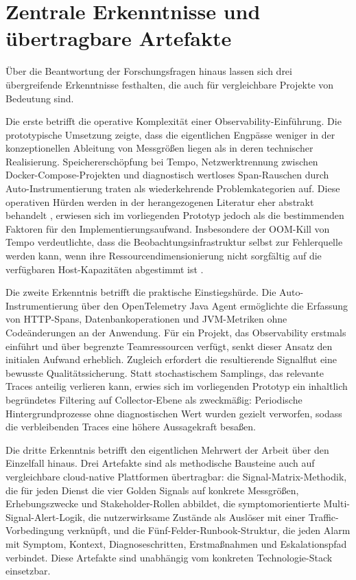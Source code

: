  
\section{Zentrale Erkenntnisse und übertragbare Artefakte}
 
Über die Beantwortung der Forschungsfragen hinaus lassen sich drei übergreifende Erkenntnisse festhalten, die auch für vergleichbare Projekte von Bedeutung sind.
 
Die erste betrifft die operative Komplexität einer Observability-Einführung. Die prototypische Umsetzung zeigte, dass die eigentlichen Engpässe weniger in der konzeptionellen Ableitung von Messgrößen liegen als in deren technischer Realisierung. Speichererschöpfung bei Tempo, Netzwerktrennung zwischen Docker-Compose-Projekten und diagnostisch wertloses Span-Rauschen durch Auto-Instrumentierung traten als wiederkehrende Problemkategorien auf. Diese operativen Hürden werden in der herangezogenen Literatur eher abstrakt behandelt \parencite[S.~7--9]{Niedermaier2019onObservability}, erwiesen sich im vorliegenden Prototyp jedoch als die bestimmenden Faktoren für den Implementierungsaufwand. Insbesondere der OOM-Kill von Tempo verdeutlichte, dass die Beobachtungsinfrastruktur selbst zur Fehlerquelle werden kann, wenn ihre Ressourcendimensionierung nicht sorgfältig auf die verfügbaren Host-Kapazitäten abgestimmt ist \parencite[S.~52]{bissig2024unified}.
 
Die zweite Erkenntnis betrifft die praktische Einstiegshürde. Die Auto-Instrumentierung über den OpenTelemetry Java Agent ermöglichte die Erfassung von HTTP-Spans, Datenbankoperationen und JVM-Metriken ohne Codeänderungen an der Anwendung. Für ein Projekt, das Observability erstmals einführt und über begrenzte Teamressourcen verfügt, senkt dieser Ansatz den initialen Aufwand erheblich. Zugleich erfordert die resultierende Signalflut eine bewusste Qualitätssicherung. Statt stochastischem Samplings, das relevante Traces anteilig verlieren kann, erwies sich im vorliegenden Prototyp ein inhaltlich begründetes Filtering auf Collector-Ebene als zweckmäßig: Periodische Hintergrundprozesse ohne diagnostischen Wert wurden gezielt verworfen, sodass die verbleibenden Traces eine höhere Aussagekraft besaßen.
 
Die dritte Erkenntnis betrifft den eigentlichen Mehrwert der Arbeit über den Einzelfall hinaus. Drei Artefakte sind als methodische Bausteine auch auf vergleichbare cloud-native Plattformen übertragbar: die Signal-Matrix-Methodik, die für jeden Dienst die vier Golden Signals auf konkrete Messgrößen, Erhebungszwecke und Stakeholder-Rollen abbildet, die symptomorientierte Multi-Signal-Alert-Logik, die nutzerwirksame Zustände als Auslöser mit einer Traffic-Vorbedingung verknüpft, und die Fünf-Felder-Runbook-Struktur, die jeden Alarm mit Symptom, Kontext, Diagnoseschritten, Erstmaßnahmen und Eskalationspfad verbindet. Diese Artefakte sind unabhängig vom konkreten Technologie-Stack einsetzbar.
 
